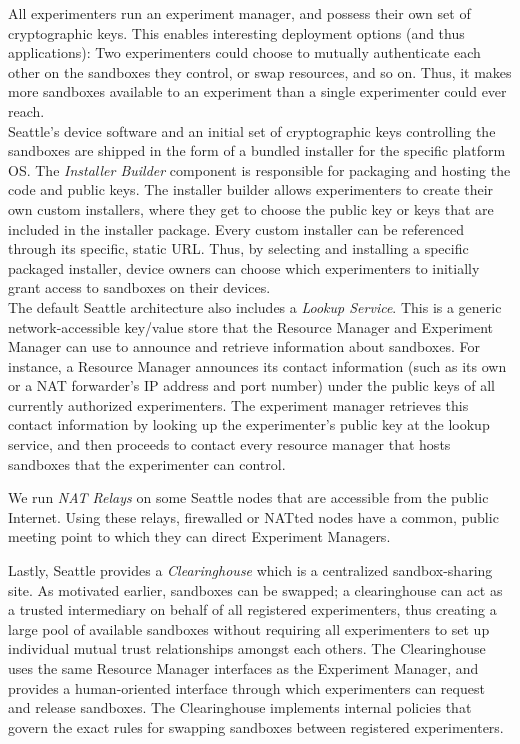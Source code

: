 All experimenters run an experiment manager, and possess
their own set of cryptographic keys. This enables interesting
deployment options (and thus applications):
Two experimenters could choose to mutually authenticate each
other on the sandboxes they control, or swap resources, and
so on. Thus, it makes more sandboxes available to an experiment than
a single experimenter could ever reach.
\\

Seattle's device software and an initial set of cryptographic
keys controlling the sandboxes are shipped in the form of a bundled
installer for the specific platform \gls{OS}.
The \textit{Installer Builder} component is responsible for
packaging and hosting the code and public keys.
The installer builder allows experimenters to create their own
custom installers, where they get to choose the public key or keys
that are included in the installer package. Every custom installer
can be referenced through its specific, static \gls{URL}.
Thus, by selecting and installing a specific packaged installer,
device owners can choose which experimenters to initially grant
access to sandboxes on their devices.
\\


The default Seattle architecture also includes a
\textit{Lookup Service}. This is a generic network-accessible
key/value store that the Resource Manager and Experiment Manager
can use to announce and retrieve information about sandboxes.
For instance, a Resource Manager announces its contact information
(such as its own or a \gls{NAT} forwarder's \gls{IP} address and port number) under
the public keys of all currently authorized experimenters.
The experiment manager retrieves this contact information by looking up
the experimenter's public key at the lookup service, and then
proceeds to contact every resource manager that hosts sandboxes
that the experimenter can control.

We run \textit{\gls{NAT} Relays} on some Seattle nodes that are
accessible from the public Internet. Using these relays, firewalled
or \gls{NAT}ted nodes have a common, public meeting point to
which they can direct Experiment Managers.

Lastly, Seattle provides a \textit{Clearinghouse} which is a
centralized sandbox-sharing site. As motivated earlier,
sandboxes can be swapped; a clearinghouse can act as a trusted
intermediary on behalf of all registered experimenters, thus creating
a large pool of available sandboxes without requiring all experimenters to
set up individual mutual trust relationships amongst each others.
The Clearinghouse uses the same Resource Manager interfaces as the
Experiment Manager, and provides a human-oriented interface through which
experimenters can request and release sandboxes.
The Clearinghouse implements internal policies
that govern the exact rules for swapping sandboxes between
registered experimenters.

